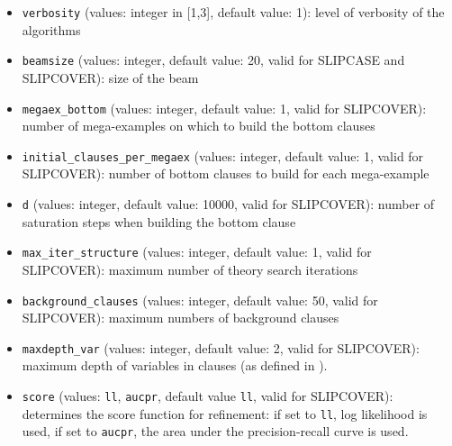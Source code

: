 \documentclass[a4paper,10pt]{article}
\begin{document}
\begin{itemize}
\item \verb|verbosity| (values: integer in [1,3], default value: 1): level of verbosity of the algorithms
\item \verb|beamsize|  (values: integer, default value: 20, valid for SLIPCASE and SLIPCOVER): size of the beam 
\item \verb|megaex_bottom| (values: integer, default value: 1, valid for SLIPCOVER): number of mega-examples on which to build the bottom clauses
\item \verb|initial_clauses_per_megaex| (values: integer, default value: 1, valid for SLIPCOVER): 
 number of bottom clauses to build for each mega-example
\item \verb|d| (values: integer, default value: 10000, valid for SLIPCOVER): 
 number of saturation steps when building the bottom clause
\item \verb|max_iter_structure| (values: integer, default value: 1, valid for SLIPCOVER): 
maximum  number of theory search iterations
\item \verb|background_clauses| (values: integer, default value: 50, valid for SLIPCOVER): 
 maximum numbers of background clauses
\item \verb|maxdepth_var| (values: integer, default value: 2, valid for SLIPCOVER): maximum depth of
variables in clauses (as defined in \cite{DBLP:journals/ai/Cohen95}).
\item \verb|score| (values: \verb|ll|, \verb|aucpr|, default value \verb|ll|, valid for SLIPCOVER): determines the score function for refinement: if set to \verb|ll|, log likelihood is used, if set to \verb|aucpr|, the area under the 
precision-recall curve is used. 
\end{itemize}
\end{document}

